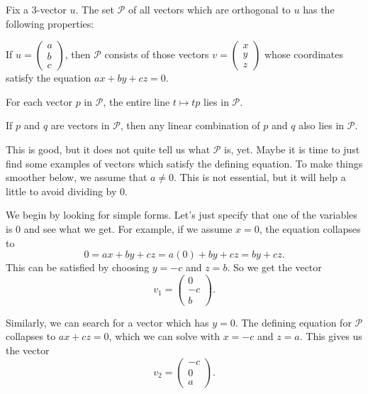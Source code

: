 \documentclass[00-livre-main.tex]{subfiles}
\begin{document}
\begin{theorem}\label{thm:plane-properties}
Fix a $3$-vector $u$. The set $\mathcal{P}$ of all vectors which are orthogonal to $u$ has the following properties:
\begin{compactitem}
\item If $u = \left(\begin{smallmatrix}a\\b\\c\end{smallmatrix}\right)$, then $\mathcal{P}$ consists of those vectors $v = \left(\begin{smallmatrix}x\\y\\z\end{smallmatrix}\right)$ whose coordinates satisfy the equation $ax+by+cz=0$.
\item For each vector $p$ in $\mathcal{P}$, the entire line $t \mapsto tp$ lies in $\mathcal{P}$.
\item If $p$ and $q$ are vectors in $\mathcal{P}$, then any linear combination of $p$ and $q$ also lies in $\mathcal{P}$.
\end{compactitem}
\end{theorem}

This is good, but it does not quite tell us what $\mathcal{P}$ is, yet. Maybe it is time to just find some examples of vectors which satisfy the defining equation. 
To make things smoother below, we assume that $a\neq 0$. This is not essential, but it will help a little to avoid dividing by $0$.

We begin by looking for simple forms. Let's just specify that one of the variables is $0$ and see what we get. For example, if we assume $x=0$, the equation collapses to
\[
0 = ax+by+cz = a(0) + by + cz = by+cz.
\]
This can be satisfied by choosing $y=-c$ and $z=b$. So we get the vector 
\[
v_1 = \begin{pmatrix} 0 \\ -c \\ b \end{pmatrix}.
\]

Similarly, we can search for a vector which has $y=0$. The defining equation for $\mathcal{P}$ collapses to $ax+cz=0$, which we can solve with $x=-c$ and $z=a$. This gives us the vector
\[
v_2 = \begin{pmatrix} -c \\ 0 \\ a \end{pmatrix}.
\]
\end{document}
